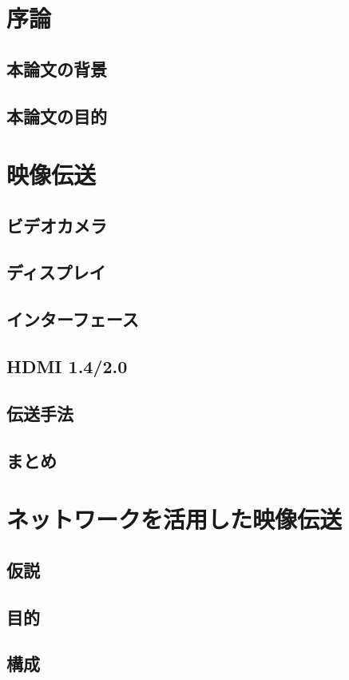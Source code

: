 \chapter{序論}
\section{本論文の背景}
\section{本論文の目的}

\chapter{映像伝送}
\section{ビデオカメラ}
\section{ディスプレイ}
\section{インターフェース}
\section{HDMI 1.4/2.0}
\section{伝送手法}
\section{まとめ}

\chapter{ネットワークを活用した映像伝送}
\section{仮説}
\section{目的}
\section{構成}
